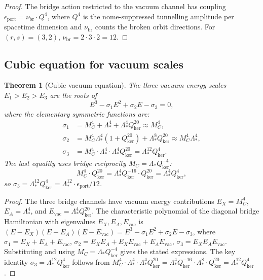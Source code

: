 \documentclass[12pt]{article}
\theoremstyle{plain}
\newtheorem{theorem}{Theorem}[section]
\theoremstyle{definition}
\numberwithin{equation}{section}
\newcommand{\br}{\mathrm{br}}
\newcommand{\kker}{\mathrm{ker}}
\begin{document}
\begin{proof}
The bridge action restricted to the vacuum channel has coupling $\epsilon_{\mathrm{port}}=\nu_{\br}\cdot Q^4$, where $Q^4$ is the nome-suppressed tunnelling amplitude per spacetime dimension and $\nu_{\br}$ counts the broken orbit directions.  For $(r,s)=(3,2)$, $\nu_{\br}=2\cdot 3\cdot 2=12$.
\end{proof}

\subsection{Cubic equation for vacuum scales}

\begin{theorem}[Cubic vacuum equation]\label{thm:cubic}
The three vacuum energy scales $E_1>E_2>E_3$ are the roots of
\begin{equation}
\boxed{E^3-\sigma_1 E^2+\sigma_2 E-\sigma_3=0,}
\end{equation}
where the elementary symmetric functions are:
\begin{align}
\sigma_1 &= M_C^4+\Lambda_*^4+\Lambda_*^4 Q_{\kker}^{20}\approx M_C^4,\\
\sigma_2 &= M_C^4\Lambda_*^4(1+Q_{\kker}^{20})+\Lambda_*^8 Q_{\kker}^{20}\approx M_C^4\Lambda_*^4,\\
\sigma_3 &= M_C^4\cdot\Lambda_*^4\cdot\Lambda_*^4 Q_{\kker}^{20}=\Lambda_*^{12}Q_{\kker}^4.
\end{align}
The last equality uses bridge reciprocity $M_C=\Lambda_* Q_{\kker}^{-4}$:
\begin{equation}
M_C^4\cdot Q_{\kker}^{20}=\Lambda_*^4 Q_{\kker}^{-16}\cdot Q_{\kker}^{20}=\Lambda_*^4 Q_{\kker}^4,
\end{equation}
so $\sigma_3=\Lambda_*^{12}Q_{\kker}^4=\Lambda_*^{12}\cdot\epsilon_{\mathrm{port}}/12$.
\end{theorem}

\begin{proof}
The three bridge channels have vacuum energy contributions $E_X=M_C^4$, $E_A=\Lambda_*^4$, and $E_{\mathrm{vac}}=\Lambda_*^4 Q_{\kker}^{20}$.  The characteristic polynomial of the diagonal bridge Hamiltonian with eigenvalues $E_X,E_A,E_{\mathrm{vac}}$ is $(E-E_X)(E-E_A)(E-E_{\mathrm{vac}})=E^3-\sigma_1 E^2+\sigma_2 E-\sigma_3$, where $\sigma_1=E_X+E_A+E_{\mathrm{vac}}$, $\sigma_2=E_XE_A+E_XE_{\mathrm{vac}}+E_AE_{\mathrm{vac}}$, $\sigma_3=E_XE_AE_{\mathrm{vac}}$.  Substituting and using $M_C=\Lambda_* Q_{\kker}^{-4}$ gives the stated expressions.  The key identity $\sigma_3=\Lambda_*^{12}Q_{\kker}^4$ follows from $M_C^4\cdot\Lambda_*^4\cdot\Lambda_*^4 Q_{\kker}^{20}=\Lambda_*^4 Q_{\kker}^{-16}\cdot\Lambda_*^8\cdot Q_{\kker}^{20}=\Lambda_*^{12}Q_{\kker}^4$.
\end{proof}
\end{document}
